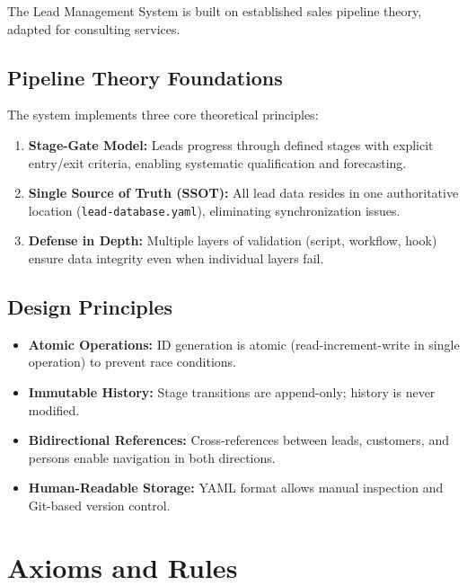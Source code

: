 The Lead Management System is built on established sales pipeline theory, adapted for consulting services.

\subsection{Pipeline Theory Foundations}

The system implements three core theoretical principles:

\begin{enumerate}
    \item \textbf{Stage-Gate Model:} Leads progress through defined stages with explicit entry/exit criteria, enabling systematic qualification and forecasting.
    \item \textbf{Single Source of Truth (SSOT):} All lead data resides in one authoritative location (\texttt{lead-database.yaml}), eliminating synchronization issues.
    \item \textbf{Defense in Depth:} Multiple layers of validation (script, workflow, hook) ensure data integrity even when individual layers fail.
\end{enumerate}

\subsection{Design Principles}

\begin{itemize}
    \item \textbf{Atomic Operations:} ID generation is atomic (read-increment-write in single operation) to prevent race conditions.
    \item \textbf{Immutable History:} Stage transitions are append-only; history is never modified.
    \item \textbf{Bidirectional References:} Cross-references between leads, customers, and persons enable navigation in both directions.
    \item \textbf{Human-Readable Storage:} YAML format allows manual inspection and Git-based version control.
\end{itemize}


\section{Axioms and Rules}
\label{sec:bn-axioms}

